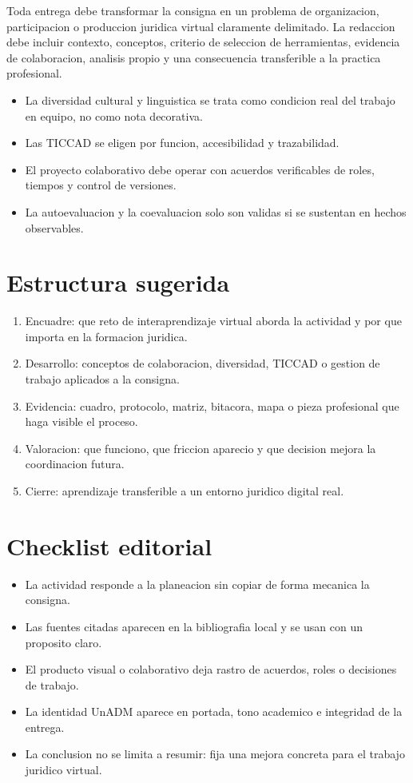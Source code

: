 \documentclass[
  spanish,
  letterpaper, oneside
]{article}
\begin{document}
Toda entrega debe transformar la consigna en un problema de organizacion,
participacion o produccion juridica virtual claramente delimitado. La redaccion
debe incluir contexto, conceptos, criterio de seleccion de herramientas,
evidencia de colaboracion, analisis propio y una consecuencia transferible a la
practica profesional.

\begin{itemize}
  \item La diversidad cultural y linguistica se trata como condicion real del trabajo en equipo, no como nota decorativa.
  \item Las TICCAD se eligen por funcion, accesibilidad y trazabilidad.
  \item El proyecto colaborativo debe operar con acuerdos verificables de roles, tiempos y control de versiones.
  \item La autoevaluacion y la coevaluacion solo son validas si se sustentan en hechos observables.
\end{itemize}

\section{Estructura sugerida}

\begin{enumerate}
  \item Encuadre: que reto de interaprendizaje virtual aborda la actividad y por que importa en la formacion juridica.
  \item Desarrollo: conceptos de colaboracion, diversidad, TICCAD o gestion de trabajo aplicados a la consigna.
  \item Evidencia: cuadro, protocolo, matriz, bitacora, mapa o pieza profesional que haga visible el proceso.
  \item Valoracion: que funciono, que friccion aparecio y que decision mejora la coordinacion futura.
  \item Cierre: aprendizaje transferible a un entorno juridico digital real.
\end{enumerate}

\section{Checklist editorial}

\begin{itemize}
  \item La actividad responde a la planeacion sin copiar de forma mecanica la consigna.
  \item Las fuentes citadas aparecen en la bibliografia local y se usan con un proposito claro.
  \item El producto visual o colaborativo deja rastro de acuerdos, roles o decisiones de trabajo.
  \item La identidad UnADM aparece en portada, tono academico e integridad de la entrega.
  \item La conclusion no se limita a resumir: fija una mejora concreta para el trabajo juridico virtual.
\end{itemize}
\end{document}
